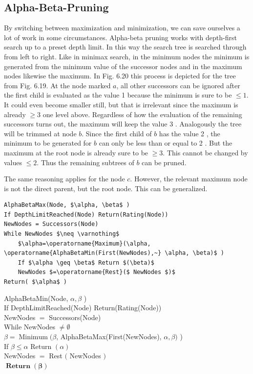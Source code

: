\documentclass[10pt]{book}
\begin{document}
\subsection{Alpha-Beta-Pruning}
By switching between maximization and minimization, we can save ourselves a lot of work in some circumstances. Alpha-beta pruning works with depth-first search up to a preset depth limit. In this way the search tree is searched through from left to right. Like in minimax search, in the minimum nodes the minimum is generated from the minimum value of the successor nodes and in the maximum nodes likewise the maximum. In Fig. 6.20 this process is depicted for the tree from Fig. 6.19. At the node marked $a$, all other successors can be ignored after the first child is evaluated as the value 1 because the minimum is sure to be $\leq 1$. It could even become smaller still, but that is irrelevant since the maximum is already $\geq 3$ one level above. Regardless of how the evaluation of the remaining successors turns out, the maximum will keep the value 3 . Analogously the tree will be trimmed at node $b$. Since the first child of $b$ has the value 2 , the minimum to be generated for $b$ can only be less than or equal to 2 . But the maximum at the root node is already sure to be $\geq 3$. This cannot be changed by values $\leq 2$. Thus the remaining subtrees of $b$ can be pruned.


The same reasoning applies for the node $c$. However, the relevant maximum node is not the direct parent, but the root node. This can be generalized.

\begin{verbatim}
AlphaBetaMax(Node, $\alpha, \beta$ )
If DepthLimitReached(Node) Return(Rating(Node))
NewNodes = Successors(Node)
While NewNodes $\neq \varnothing$
    $\alpha=\operatorname{Maximum}(\alpha, \operatorname{AlphaBetaMin(First(NewNodes),~} \alpha, \beta)$ )
    If $\alpha \geq \beta$ Return $(\beta)$
    NewNodes $=\operatorname{Rest}($ NewNodes $)$
Return( $\alpha$ )
\end{verbatim}

AlphaBetaMin(Node, $\alpha, \beta$ )\\
If DepthLimitReached(Node) Return(Rating(Node))\\
NewNodes $=$ Successors(Node)\\
While NewNodes $\neq \emptyset$\\
$\beta=\operatorname{Minimum}(\beta$, AlphaBetaMax(First(NewNodes), $\alpha, \beta)$ )\\
If $\beta \leq \alpha$ Return $(\alpha)$\\
NewNodes $=$ Rest $($ NewNodes $)$\\
$\boldsymbol{\operatorname { R e t u r n }}(\boldsymbol{\beta})$
\end{document}

